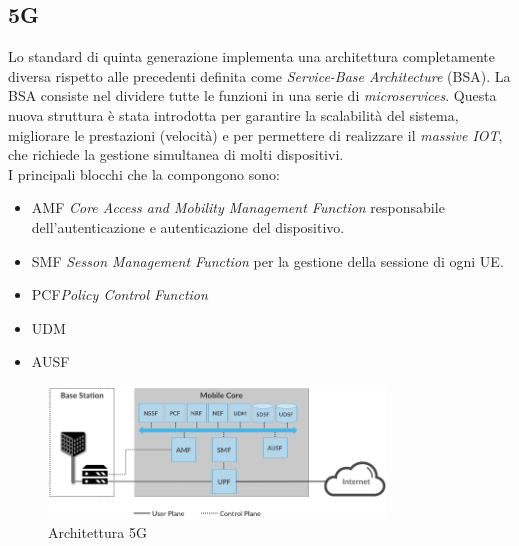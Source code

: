 \clearpage

\subsection{5G}
Lo standard di quinta generazione implementa una architettura completamente diversa rispetto alle precedenti definita come 
\textit{Service-Base Architecture} (BSA).
La BSA consiste nel dividere tutte le funzioni in una serie di \textit{microservices}\cite{5g-approach}. 
Questa nuova struttura è stata introdotta per garantire la scalabilità del sistema, migliorare le prestazioni (velocità) e per 
permettere di realizzare il \textit{massive IOT}, che richiede la gestione simultanea di molti dispositivi.\\
I principali blocchi che la compongono sono:
\begin{itemize}
    \item AMF \textit{Core Access and Mobility Management Function} responsabile dell'autenticazione e autenticazione del dispositivo.
    \item SMF \textit{Sesson Management Function} per la gestione della sessione di ogni UE.
    \item PCF\textit{Policy Control Function}
    \item UDM
    \item AUSF
\end{itemize}

\begin{figure}[ht]
    \centering
    \includegraphics[width=0.8\textwidth]{images/5g-planes.png}
    \caption{Architettura 5G\cite{5g-approach}}
\end{figure}